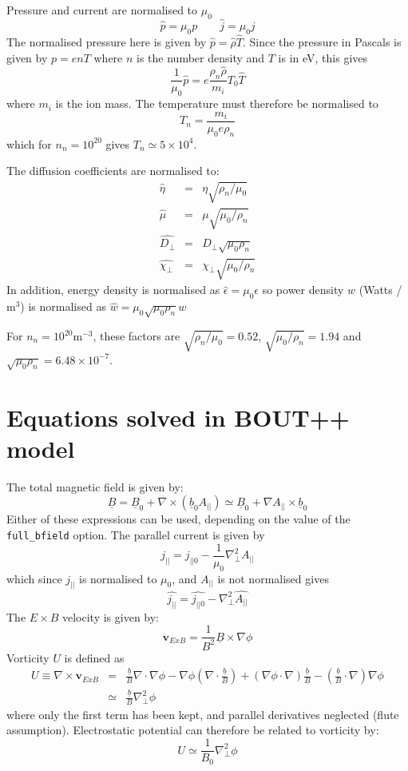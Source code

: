 \documentclass[12pt]{article}
\newcommand{\Vec}[1]{\ensuremath{\mathbf{#1}}}
\newcommand{\Div}[1]{\ensuremath{\nabla\cdot #1 }}
\newcommand{\Curl}[1]{\ensuremath{\nabla\times #1 }}
\newcommand{\Bvec}{\ensuremath{\underline{B}}}
\newcommand{\bvec}{\ensuremath{\underline{b}}}
\newcommand{\apar}{\ensuremath{A_{||}}}
\begin{document}
Pressure and current are normalised to $\mu_0$
\[
\hat{p} = \mu_0 p \qquad \hat{j} = \mu_0 j
\]
The normalised pressure here is given by $\hat{p} = \hat{\rho}\hat{T}$.
Since the pressure in Pascals is given by $p = enT$ where $n$ is the number
density and $T$ is in eV, this gives
\[
\frac{1}{\mu_0}\hat{p} = e\frac{\rho_n\hat{\rho}}{m_i} T_0\hat{T}
\]
where $m_i$ is the ion mass. The temperature must therefore be normalised to
\[
T_n = \frac{m_i}{\mu_0 e \rho_n}
\]
which for $n_n=10^{20}$ gives $T_n\simeq 5\times 10^4$.

The diffusion coefficients are normalised to:
\begin{eqnarray*}
\hat{\eta} &=& \eta\sqrt{\rho_n / \mu_0} \\
\hat{\mu} &=& \mu\sqrt{\mu_0/\rho_n} \\
\hat{D_\perp} &=& D_\perp\sqrt{\mu_0\rho_n} \\
\hat{\chi_\perp} &=& \chi_\perp\sqrt{\mu_0/\rho_n}
\end{eqnarray*}
In addition, energy density is normalised as $\hat{\epsilon} = \mu_0\epsilon$ so
power density $w$ (Watts / m$^3$) is normalised as 
$\hat{w} = \mu_0\sqrt{\mu_0\rho_n} w$

For $n_n=10^{20}$m$^{-3}$, these factors are $\sqrt{\rho_n / \mu_0} = 0.52$, $\sqrt{\mu_0/\rho_n}=1.94$ and $\sqrt{\mu_0\rho_n} = 6.48\times 10^{-7}$. 

\section{Equations solved in BOUT++ model}

The total magnetic field is given by:
\[
\Bvec = \Bvec_0 + \nabla\times\left(\bvec_0\apar\right) \simeq \Bvec_0 + \nabla\apar \times\bvec_0
\]
Either of these expressions can be used, depending on the value of the \texttt{full\_bfield} option. The parallel current is given by
\[
j_{||} = j_{||0} - \frac{1}{\mu_0}\nabla_\perp^2\apar
\]
which since $j_{||}$ is normalised to $\mu_0$, and $\apar$ is not normalised gives
\[
\hat{j_{||}} = \hat{j_{||0}} - \nabla_\perp^2\hat{\apar}
\]
The $E\times B$ velocity is given by:
\[
\Vec{v}_{ExB} = \frac{1}{B^2}\Bvec\times\nabla\phi
\]
Vorticity $U$ is defined as 
\begin{eqnarray*}
U \equiv \Curl{\Vec{v}_{ExB}} &=& \frac{\bvec}{B}\Div{\nabla\phi} - \nabla\phi\left(\Div{\frac{\bvec}{B}}\right) + \left(\nabla\phi\cdot\nabla\right)\frac{\bvec}{B} - \left(\frac{\bvec}{B}\cdot\nabla\right)\nabla\phi \\
&\simeq& \frac{\bvec}{B}\nabla_\perp^2\phi
\end{eqnarray*}
where only the first term has been kept, and parallel derivatives neglected (flute assumption). Electrostatic potential can therefore be related to 
vorticity by:
\[
U \simeq \frac{1}{B_0}\nabla_\perp^2\phi
\]
\end{document}

